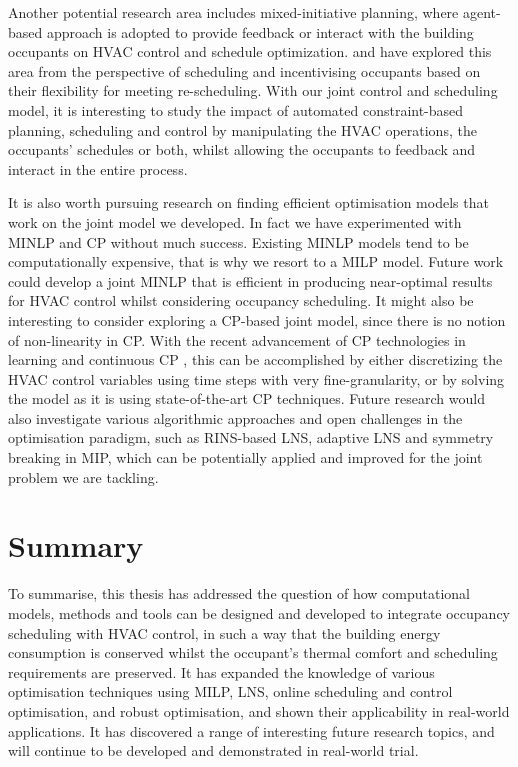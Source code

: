 Another potential research area includes mixed-initiative planning, where agent-based approach is adopted to provide feedback or interact with the building occupants on HVAC control and schedule optimization. \citep{klein2012coordinating} and \citep{kwak2014building} have explored this area from the perspective of scheduling and incentivising occupants based on their flexibility for meeting re-scheduling. With our joint control and scheduling model, it is interesting to study the impact of automated constraint-based planning, scheduling and control by manipulating the HVAC operations, the occupants' schedules or both, whilst allowing the occupants to feedback and interact in the entire process.

It is also worth pursuing research on finding efficient optimisation models that work on the joint model we developed. In fact we have experimented with MINLP and CP without much success. Existing MINLP models tend to be computationally expensive, that is why we resort to a MILP model. Future work could develop a joint MINLP that is efficient in producing near-optimal results for HVAC control whilst considering occupancy scheduling. It might also be interesting to consider exploring a CP-based joint model, since there is no notion of non-linearity in CP. With the recent advancement of CP technologies in learning \citep{chu2011improving,schutt2011improving} and continuous CP \citep{feydy2016interval}, this can be accomplished by either discretizing the HVAC control variables using time steps with very fine-granularity, or by solving the model as it is using state-of-the-art CP techniques. Future research would also investigate various algorithmic approaches and open challenges in the optimisation paradigm, such as RINS-based LNS, adaptive LNS and symmetry breaking in MIP, which can be potentially applied and improved for the joint problem we are tackling.
%

\section{Summary}

To summarise, this thesis has addressed the question of how computational models, methods and tools can be designed and developed to integrate occupancy scheduling with HVAC control, in such a way that the building energy consumption is conserved whilst the occupant's thermal comfort and scheduling requirements are preserved. It has expanded the knowledge of various optimisation techniques using MILP, LNS, online scheduling and control optimisation, and robust optimisation, and shown their applicability in real-world applications. It has discovered a range of interesting future research topics, and will continue to be developed and demonstrated in real-world trial.

